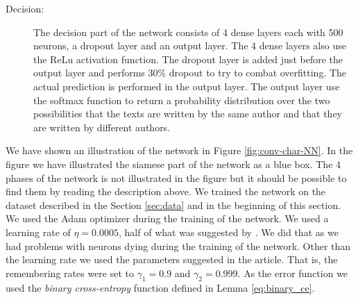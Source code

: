 \begin{description}
    \item[Decision:]

        The decision part of the network consists of 4 dense layers each with
        500 neurons, a dropout layer and an output layer. The 4 dense layers
        also use the \gls{ReLu} activation function. The dropout layer is added
        just before the output layer and performs 30\% dropout to try to combat
        overfitting. The actual prediction is performed in the output layer.
        The output layer use the softmax function to return a probability
        distribution over the two possibilities that the texts are written by
        the same author and that they are written by different authors.

\end{description}

We have shown an illustration of the network in Figure \ref{fig:conv-char-NN}.
In the figure we have illustrated the siamese part of the network as a blue
box. The 4 phases of the network is not illustrated in the figure but it
should be possible to find them by reading the description above. We trained
the network on the dataset described in the Section \ref{sec:data} and in
the beginning of this section. We used the \gls{Adam} optimizer during the
training of the network. We used a learning rate of $\eta = 0.0005$, half of
what was suggested by \citet{DBLP:journals/corr/KingmaB14}. We did that as we
had problems with neurons dying during the training of the network. Other than
the learning rate we used the parameters suggested in the article. That is, the
remembering rates were set to $\gamma_1 = 0.9$ and $\gamma_2 = 0.999$. As the
error function we used the \textit{binary cross-entropy} function defined in
Lemma \eqref{eq:binary_ce}.


